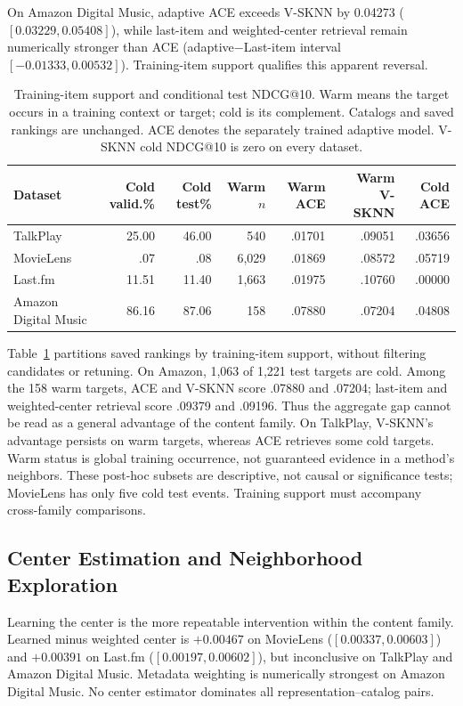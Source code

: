 \documentclass[runningheads]{llncs}
\newcommand{\method}{\textsc{ACE}}
\begin{document}
On Amazon Digital Music, adaptive \method{} exceeds V-SKNN by
0.04273 ($[0.03229,0.05408]$), while last-item and weighted-center retrieval
remain numerically stronger than \method{} (adaptive$-$Last-item interval
$[-0.01333,0.00532]$). Training-item support qualifies this apparent reversal.

\begin{table}[t]
\centering\scriptsize
\setlength{\tabcolsep}{2pt}
\caption{Training-item support and conditional test NDCG@10. Warm means the
target occurs in a training context or target; cold is its complement.
Catalogs and saved rankings are unchanged. ACE denotes the separately trained
adaptive model. V-SKNN cold NDCG@10 is zero on every dataset.}
\label{tab:target-support}
\begin{tabular}{lrrrrrr}
\toprule
Dataset & Cold valid.\% & Cold test\% & Warm $n$ & Warm ACE & Warm V-SKNN & Cold ACE\\
\midrule
TalkPlay & 25.00 & 46.00 & 540 & .01701 & .09051 & .03656\\
MovieLens & .07 & .08 & 6,029 & .01869 & .08572 & .05719\\
Last.fm & 11.51 & 11.40 & 1,663 & .01975 & .10760 & .00000\\
Amazon Digital Music & 86.16 & 87.06 & 158 & .07880 & .07204 & .04808\\
\bottomrule
\end{tabular}
\end{table}

Table~\ref{tab:target-support} partitions saved rankings by training-item
support, without filtering candidates or retuning. On Amazon, 1,063 of 1,221
test targets are cold. Among the 158 warm targets, ACE and V-SKNN score
.07880 and .07204; last-item and weighted-center retrieval score .09379 and
.09196. Thus the aggregate gap cannot be read as a general advantage of the
content family. On TalkPlay, V-SKNN's advantage persists on warm targets,
whereas ACE retrieves some cold targets. Warm status is global training
occurrence, not guaranteed evidence in a method's neighbors. These post-hoc
subsets are descriptive, not causal or significance tests; MovieLens has only
five cold test events. Training support must accompany cross-family comparisons.

\subsection{Center Estimation and Neighborhood Exploration}

Learning the center is the more repeatable intervention within the content
family. Learned minus weighted center is $+0.00467$ on MovieLens
($[0.00337,0.00603]$) and $+0.00391$ on Last.fm
($[0.00197,0.00602]$), but inconclusive on TalkPlay and Amazon Digital Music.
Metadata weighting is numerically strongest on Amazon Digital Music. No center estimator dominates all
representation--catalog pairs.
\end{document}
